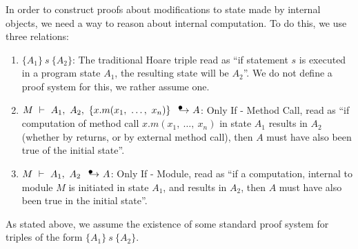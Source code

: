 \documentclass[12pt]{article}
\newcommand\intstep{\hspace{1.5mm}{\raisebox{3pt}{$\bullet$}}\hspace{-1.5mm}{\hookrightarrow}}
\newcommand\oiInternal[3]{#1,\ #2\ \intstep\ #3}
\newcommand\hoare[3]{\{#1\}\ #2\ \{#3\}}
\newcommand\hoareIf[4]{#1,\ #2,\ \{#3\}\ \intstep\ #4}
\numberwithin{case}{lemma}
\numberwithin{case}{theorem}
\numberwithin{subcase}{case}
\begin{document}
{In order to construct proofs about modifications to state made by 
internal objects, we need a way to reason about internal computation.
To do this, we use three relations:
\begin{enumerate}
\item
$\hoare{A_1}{s}{A_2}$: The traditional Hoare triple read as ``if statement $s$ is executed in 
a program state $A_1$, the resulting state will be $A_2$''. We do not define a proof system 
for this, we rather assume one.
\item
$M\ \vdash\ \hoareIf{A_1}{A_2}{x.m(x_1,\ \ldots,\ x_n)}{A}$: Only If - Method Call, read as ``if computation of 
method call $x.m(x_1,\ \ldots,\ x_n)$ in state $A_1$
results in $A_2$ (whether by returns, or by external method call), 
then $A$ must have also been true of the initial state''.
\item
$M\ \vdash\ \oiInternal{A_1}{A_2}{A}$: Only If - Module, read as ``if a computation, internal
to module $M$ is initiated in state $A_1$, and results in $A_2$, then $A$ must have also been true 
in the initial state''.
\end{enumerate}
As stated above, we assume the existence of some standard proof system for triples of the form $\hoare{A_1}{s}{A_2}$.
}
\end{document}
